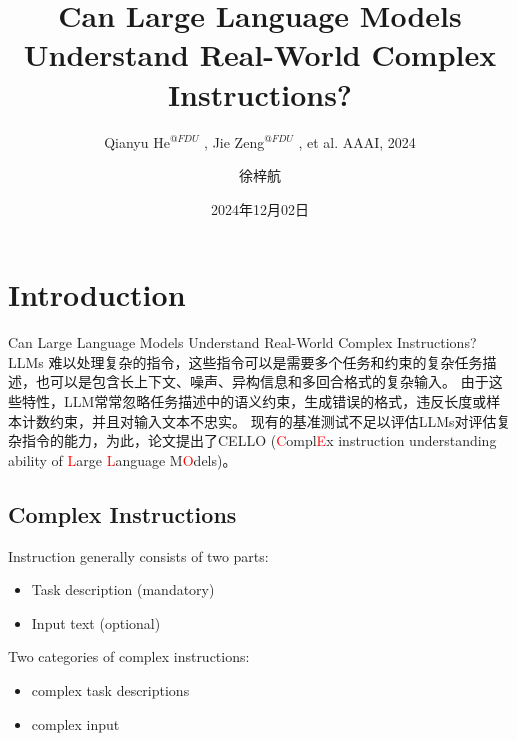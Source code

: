 \documentclass{beamer}
\author{徐梓航}
\title{Can Large Language Models Understand Real-World Complex Instructions?}
\subtitle{
    \scriptsize
    Qianyu He\scriptsize\texorpdfstring{$^{@FDU}$}{\textit{@FDU}}
    \normalfont
    , Jie Zeng\scriptsize\texorpdfstring{$^{@FDU}$}{\textit{@FDU}}
    \normalfont
    , et al. AAAI, 2024
}
\institute{华中科技大学计算机科学与技术学院}
\date{2024年12月02日}
\begin{document}
\begin{frame}
    \titlepage
    \begin{figure}[htpb]
    \end{figure}
\end{frame}

\begin{frame}
    \tableofcontents[sectionstyle=show,subsectionstyle=show/shaded/hide,subsubsectionstyle=show/shaded/hide]
\end{frame}

\section{Introduction}

\begin{frame}{Can Large Language Models Understand Real-World Complex Instructions?}
    LLMs 难以处理复杂的指令，这些指令可以是需要多个任务和约束的复杂任务描述，也可以是包含长上下文、噪声、异构信息和多回合格式的复杂输入。
    \newline
    \newline
    由于这些特性，LLM常常忽略任务描述中的语义约束，生成错误的格式，违反长度或样本计数约束，并且对输入文本不忠实。
    \newline
    \newline
    现有的基准测试不足以评估LLMs对评估复杂指令的能力，为此，论文提出了CELLO (\textcolor{red}{C}ompl\textcolor{red}{E}x instruction understanding ability of \textcolor{red}{L}arge \textcolor{red}{L}anguage M\textcolor{red}{O}dels)。
\end{frame}

\subsection{Complex Instructions}

\begin{frame}
    Instruction generally consists of two parts:
    \begin{itemize}
        \item {Task description (mandatory)}
        \item {Input text (optional)}
    \end{itemize}

    Two categories of complex instructions:
    \begin{itemize}
        \item {complex task descriptions}
        \item {complex input}
    \end{itemize}
\end{frame}
\end{document}
